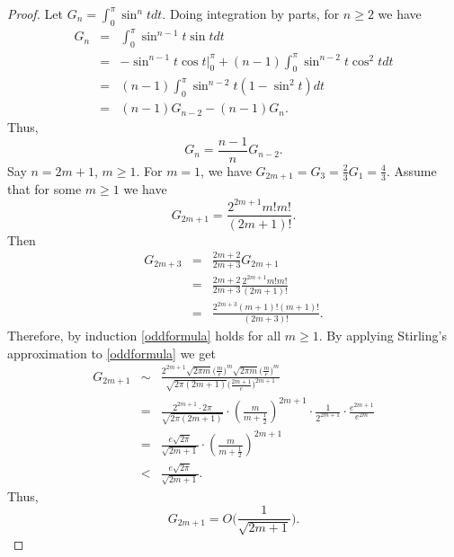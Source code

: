\documentclass{amsart}
\begin{document}
\begin{proof}
Let $G_n=\int_0^\pi \sin^n t dt$. 
Doing integration by parts, for $n \geq 2$ we have
\begin{eqnarray*}
G_n&=&\int_0^\pi \sin^{n-1}t \sin t dt\\
&=&-\sin^{n-1}t \cos t \Big |_0^\pi+(n-1)\int_0^\pi \sin^{n-2}t \cos^2 t dt\\
&=&(n-1)\int_0^\pi \sin^{n-2}t (1-\sin^2 t) dt\\
&=&(n-1)G_{n-2}-(n-1)G_n.
\end{eqnarray*}
Thus,
\[
G_n=\frac{n-1}{n}G_{n-2}.
\]
Say $n=2m+1$, $m \geq 1$.
For $m=1$, we have $G_{2m+1}=G_3=\frac{2}{3}G_1=\frac{4}{3}$. Assume that for some $m \geq 1$ we have
\begin{equation}
G_{2m+1}=\frac{2^{2m+1}m!m!}{(2m+1)!}.
\label{oddformula}
\end{equation}
Then
\begin{eqnarray*}
G_{2m+3}&=&\frac{2m+2}{2m+3}G_{2m+1}\\
&=&\frac{2m+2}{2m+3} \frac{2^{2m+1}m!m!}{(2m+1)!}\\
&=&\frac{2^{2m+3}(m+1)!(m+1)!}{(2m+3)!}.
\end{eqnarray*}
Therefore, by induction \eqref{oddformula} holds for all $m \geq 1$.
By applying Stirling's approximation to \eqref{oddformula} we get
\begin{eqnarray*}
G_{2m+1}&\sim&\frac{2^{2m+1} \sqrt{2\pi m} \Big(\frac{m}{e}\Big)^m 
 \sqrt{2\pi m} \Big(\frac{m}{e}\Big)^m}{\sqrt{2\pi(2m+1)}\Big( \frac{2m+1}{e} \Big)^{2m+1}}\\
 &=&\frac{2^{2m+1}\cdot 2\pi}{\sqrt{2\pi (2m+1)}}\cdot \left(\frac{m}{m+\frac{1}{2}} \right)^{2m+1} \cdot \frac{1}{2^{2m+1}} \cdot \frac{e^{2m+1}}{e^{2m}}\\
&=&\frac{e\sqrt{2\pi}}{\sqrt{2m+1}} \cdot \left(\frac{m}{m+\frac{1}{2}} \right)^{2m+1}\\
&<&\frac{e\sqrt{2\pi}}{\sqrt{2m+1}}.
\end{eqnarray*}
Thus,
\[
G_{2m+1}=O\Big(\frac{1}{\sqrt{2m+1}}\Big).
\]


\end{proof}
\end{document}
